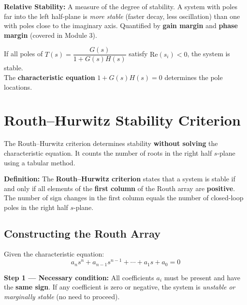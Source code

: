 \documentclass[12pt,a4paper]{article}
\begin{document}
\begin{tcolorbox}[defbox]
\textbf{Relative Stability:} A measure of the degree of stability. A system with poles far into the left half-plane is \textit{more stable} (faster decay, less oscillation) than one with poles close to the imaginary axis. Quantified by \textbf{gain margin} and \textbf{phase margin} (covered in Module 3).
\end{tcolorbox}

\begin{tcolorbox}[formulabox, title={Key Concept}]
If all poles of $T(s) = \dfrac{G(s)}{1+G(s)H(s)}$ satisfy $\text{Re}(s_i) < 0$, the system is stable.\\[4pt]
The \textbf{characteristic equation} $1 + G(s)H(s) = 0$ determines the pole locations.
\end{tcolorbox}

\section{Routh–Hurwitz Stability Criterion}

The Routh–Hurwitz criterion determines stability \textbf{without solving} the characteristic equation. It counts the number of roots in the right half $s$-plane using a tabular method.

\begin{tcolorbox}[defbox]
\textbf{Definition:} The \textbf{Routh–Hurwitz criterion} states that a system is stable if and only if all elements of the \textbf{first column} of the Routh array are \textbf{positive}. The number of sign changes in the first column equals the number of closed-loop poles in the right half $s$-plane.
\end{tcolorbox}

\subsection{Constructing the Routh Array}

Given the characteristic equation:
$$a_n s^n + a_{n-1}s^{n-1} + \cdots + a_1 s + a_0 = 0$$

\textbf{Step 1 — Necessary condition:} All coefficients $a_i$ must be present and have the \textbf{same sign}. If any coefficient is zero or negative, the system is \textit{unstable or marginally stable} (no need to proceed).
\end{document}
